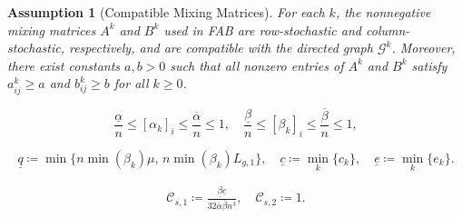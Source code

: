\documentclass[10pt,a4paper]{amsart}
\newtheorem{assumption}{Assumption}
\begin{document}
\begin{assumption}[Compatible Mixing Matrices]\label{ass:matrix}
    For each $k$, the nonnegative mixing matrices $A^k$ and $B^k$ used in FAB are row-stochastic and column-stochastic, respectively, and are compatible with the directed graph $\mathcal{G}^{k}$. Moreover, there exist constants $a, b >0$ such that all nonzero entries of $A^k$ and $B^k$ satisfy $a_{ij}^{k}\geq a$ and $b_{ij}^{k}\geq b$ for all $k\geq 0$.
\end{assumption}

\begin{equation}\label{eq:weight_bounds}
    \frac{\underline{\alpha}}{n} \leq [\alpha_{k}]_{i} \leq \frac{\overline{\alpha}}{n} \leq 1, \quad \frac{\underline{\beta}}{n} \leq [\beta_{k}]_{i} \leq \frac{\overline{\beta}}{n} \leq 1,
\end{equation}

\begin{equation}\label{eq:constants_summary}
    \underline{q} \coloneqq \min\big\{ n \min(\beta_{k})\mu, \, n \min(\beta_{k})L_{g,1} \big\}, \quad 
    \underline{c} \coloneqq \min_{k} \{c_{k}\}, \quad 
    \underline{e} \coloneqq \min_{k} \{e_{k}\}.
\end{equation}

\begin{align}\label{eq:lyapunov_coeffs_single}
    \mathcal{C}_{s,1} \coloneqq \frac{\underline{\beta}\underline{c}  }{32 \overline{\alpha}\overline{\beta} n^{3}}, \quad \mathcal{C}_{s,2} \coloneqq 1.
\end{align}
\end{document}
